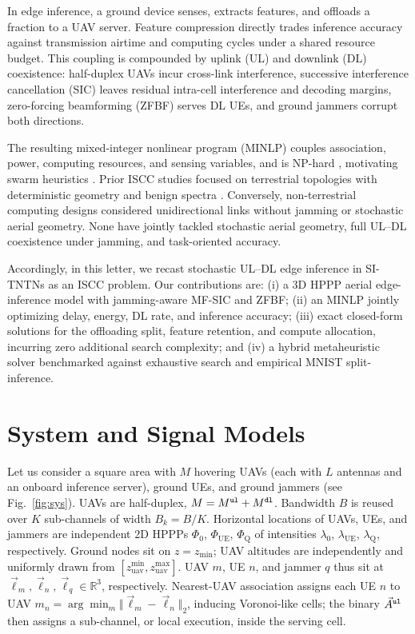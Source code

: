 \documentclass[journal]{IEEEtran}
\begin{document}
{\color{blue}In edge inference, a ground device senses, extracts features, and offloads a fraction to a UAV server. Feature compression directly trades inference accuracy against transmission airtime and computing cycles under a shared resource budget. This coupling is compounded by uplink (UL) and downlink (DL) coexistence: half-duplex UAVs incur cross-link interference, successive interference cancellation (SIC) leaves residual intra-cell interference and decoding margins, zero-forcing beamforming (ZFBF) serves DL UEs, and ground jammers corrupt both directions.}

{\color{blue}The resulting mixed-integer nonlinear program (MINLP) couples association, power, computing resources, and sensing variables, and is NP-hard \cite{Hoang_TCOM_2024}, motivating swarm heuristics \cite{book_SI2010,genetic_optim}. Prior ISCC studies focused on terrestrial topologies with deterministic geometry and benign spectra \cite{wen2024iscc,yao2025edgeinf,wen2025survey}. Conversely, non-terrestrial computing designs \cite{tang2025ntn,du2026uavinf} considered unidirectional links without jamming or stochastic aerial geometry. None have jointly tackled stochastic aerial geometry, full UL--DL coexistence under jamming, and task-oriented accuracy.}

{\color{blue}Accordingly, in this letter, we recast stochastic UL--DL edge inference in SI-TNTNs as an ISCC problem. Our contributions are: (i) a 3D HPPP aerial edge-inference model with jamming-aware MF-SIC and ZFBF; (ii) an MINLP jointly optimizing delay, energy, DL rate, and inference accuracy; (iii) exact closed-form solutions for the offloading split, feature retention, and compute allocation, incurring zero additional search complexity; and (iv) a hybrid metaheuristic solver benchmarked against exhaustive search and empirical MNIST split-inference.}

\section{System and Signal Models}
\label{sec:model}
Let us consider a square area with $M$ hovering UAVs (each with $L$ antennas and an onboard inference server), ground UEs, and ground jammers (see Fig.~\ref{fig:sys}). UAVs are half-duplex, $M=M^{\tt ul}+M^{\tt dl}$. Bandwidth $B$ is reused over $K$ sub-channels of width $B_k=B/K$. Horizontal locations of UAVs, UEs, and jammers are independent 2D HPPPs $\Phi_0$, $\Phi_{\mathrm{UE}}$, $\Phi_{\mathrm{Q}}$ of intensities $\lambda_0$, $\lambda_{\mathrm{UE}}$, $\lambda_{\mathrm{Q}}$, respectively. 
Ground nodes sit on $z=z_{\min}$; UAV altitudes are independently and uniformly drawn from $[z_{\mathrm{uav}}^{\min},z_{\mathrm{uav}}^{\max}]$. UAV $m$, UE $n$, and jammer $q$ thus sit at $\vec{\ell}_m,\vec{\ell}_n,\vec{\ell}_q\in\mathbb{R}^3$, respectively. 
{Nearest-UAV association assigns each UE $n$ to UAV $m_n=\arg\min_m \Vert\vec{\ell}_m-\vec{\ell}_n\Vert_2$},
inducing Voronoi-like cells; 
the binary $\vec{A}^{\tt ul}$ then assigns a sub-channel, or local execution, inside the serving cell.
\end{document}
